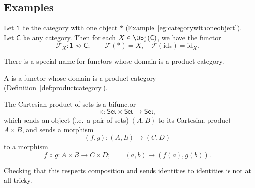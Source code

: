 \documentclass[notes.tex]{subfiles}
\begin{document}
\subsection{Examples}

\begin{example}
  \label{eg:functorfrom1category}
  Let $\mathsf{1}$ be the category with one object $*$ (\hyperref[eg:categorywithoneobject]{Example~\ref*{eg:categorywithoneobject}}). Let $\mathsf{C}$ be any category. Then for each $X \in \Obj(\mathsf{C})$, we have the functor
  \begin{equation*}
    \mathcal{F}_{X}\colon \mathsf{1} \rightsquigarrow \mathsf{C};\qquad \mathcal{F}(*) = X,\quad \mathcal{F}(\mathrm{id}_{*}) = \mathrm{id}_{X}.
  \end{equation*}
\end{example}

There is a special name for functors whose domain is a product category.

\begin{definition}[bifunctor]
  \label{def:bifunctor}
  A  is a functor whose domain is a product category (\hyperref[def:productcategory]{Definition~\ref*{def:productcategory}}).
\end{definition}

\begin{example}
  \label{eg:cartesian_product_of_sets_is_bifunctor}
  The Cartesian product of sets is a bifunctor
  \begin{equation*}
    \times\colon \mathsf{Set} \times \mathsf{Set} \to \mathsf{Set},
  \end{equation*}
  which sends an object (i.e.\ a pair of sets) $(A, B)$ to its Cartesian product $A \times B$, and sends a morphism
  \begin{equation*}
    (f, g)\colon (A, B) \to (C, D)
  \end{equation*}
  to a morphism
  \begin{equation*}
    f \times g\colon A \times B \to C \times D;\qquad (a, b) \mapsto (f(a), g(b)).
  \end{equation*}

  Checking that this respects composition and sends identities to identities is not at all tricky.
\end{example}
\end{document}
